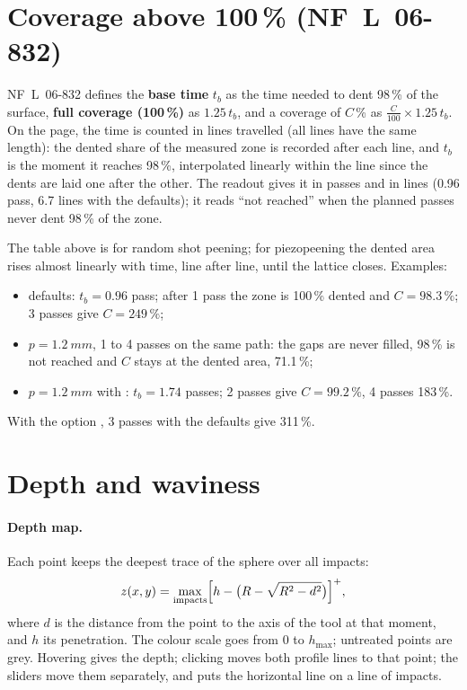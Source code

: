 \documentclass[11pt,a4paper]{article}
\begin{document}
\section{Coverage above 100\,\% (NF~L~06-832)}\label{sec:nf}

NF~L~06-832 defines the \textbf{base time} $t_b$ as the time needed to dent 98\,\% of the surface, \textbf{full coverage (100\,\%)} as $1.25\,t_b$, and a coverage of $C$\,\% as $\frac{C}{100}\times1.25\,t_b$. On the page, the time is counted in lines travelled (all lines have the same length): the dented share of the measured zone is recorded after each line, and $t_b$ is the moment it reaches 98\,\%, interpolated linearly within the line since the dents are laid one after the other. The readout  gives it in passes and in lines (0.96 pass, 6.7 lines with the defaults); it reads ``not reached'' when the planned passes never dent 98\,\% of the zone.



\noindent The table above is for random shot peening; for piezopeening the dented area rises almost linearly with time, line after line, until the lattice closes. Examples:
\begin{itemize}[nosep]
\item defaults: $t_b=0.96$ pass; after 1 pass the zone is 100\,\% dented and $C=98.3\,\%$; 3 passes give $C=249\,\%$;
\item $p=\SI{1.2}{mm}$, 1 to 4 passes on the same path: the gaps are never filled, 98\,\% is not reached and $C$ stays at the dented area, 71.1\,\%;
\item $p=\SI{1.2}{mm}$ with : $t_b=1.74$ passes; 2 passes give $C=99.2\,\%$, 4 passes 183\,\%.
\end{itemize}
With the option , 3 passes with the defaults give 311\,\%.

\section{Depth and waviness}\label{sec:depth}

\paragraph{Depth map.} Each point keeps the deepest trace of the sphere over all impacts:
\begin{equation}
z(x,y)=\max_\text{impacts}\Bigl[h-\bigl(R-\sqrt{R^2-d^2}\bigr)\Bigr]^+,
\end{equation}
where $d$ is the distance from the point to the axis of the tool at that moment, and $h$ its penetration. The colour scale goes from 0 to $h_\mathrm{max}$; untreated points are grey. Hovering gives the depth; clicking moves both profile lines to that point; the sliders move them separately, and  puts the horizontal line on a line of impacts.
\end{document}
